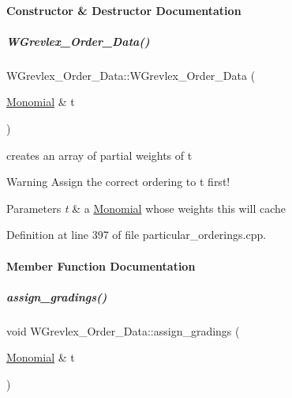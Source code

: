 \paragraph{Constructor \& Destructor Documentation}
\mbox{\label{group__orderinggroup_ad81bc55e04131b2d23371f6ce71d0422}} 
\subparagraph{\texorpdfstring{W\+Grevlex\+\_\+\+Order\+\_\+\+Data()}{WGrevlex\_Order\_Data()}}
{\footnotesize\ttfamily W\+Grevlex\+\_\+\+Order\+\_\+\+Data\+::\+W\+Grevlex\+\_\+\+Order\+\_\+\+Data (\begin{DoxyParamCaption}\item[{\hyperlink{group__polygroup_class_monomial}{Monomial} \&}]{t }\end{DoxyParamCaption})}



creates an array of partial weights of {\ttfamily t} 

\begin{DoxyWarning}{Warning}
Assign the correct ordering to {\ttfamily t} first! 
\end{DoxyWarning}

\begin{DoxyParams}{Parameters}
{\em t} & a \hyperlink{group__polygroup_class_monomial}{Monomial} whose weights {\ttfamily this} will cache \\
\hline
\end{DoxyParams}


Definition at line 397 of file particular\+\_\+orderings.\+cpp.



\paragraph{Member Function Documentation}
\mbox{\label{group__orderinggroup_a48f5464aaed30ba07d3eace69b2d87c1}} 
\subparagraph{\texorpdfstring{assign\+\_\+gradings()}{assign\_gradings()}}
{\footnotesize\ttfamily void W\+Grevlex\+\_\+\+Order\+\_\+\+Data\+::assign\+\_\+gradings (\begin{DoxyParamCaption}\item[{\hyperlink{group__polygroup_class_monomial}{Monomial} \&}]{t }\end{DoxyParamCaption})}



